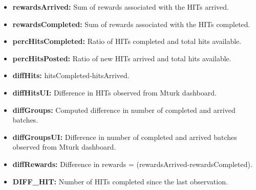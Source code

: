 \begin{itemize}[noitemsep]
\item \textbf{rewardsArrived:} Sum of rewards associated with the HITs arrived.
\item \textbf{rewardsCompleted:} Sum of rewards associated with the HITs completed.
\item \textbf{percHitsCompleted:} Ratio of HITs completed and total hits available.
\item \textbf{percHitsPosted:} Ratio of new HITs arrived and total hits available.
\item \textbf{diffHits:} hitsCompleted-hitsArrived.
\item \textbf{diffHitsUI:} Difference in HITs observed from Mturk dashboard.
\item \textbf{diffGroups:} Computed difference in number of completed and arrived batches.
\item \textbf{diffGroupsUI:} Difference in number of completed and arrived batches observed from Mturk dashboard.
\item \textbf{diffRewards:} Difference in rewards = (rewardsArrived-rewardsCompleted).
\item \textbf{DIFF\_HIT:} Number of HITs completed since the last observation.
\end{itemize}